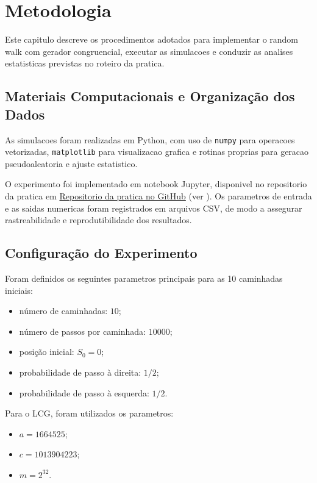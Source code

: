 \chapter{Metodologia}
\label{chap_metodologia}
Este capitulo descreve os procedimentos adotados para implementar o random walk com gerador congruencial, executar as simulacoes e conduzir as analises estatisticas previstas no roteiro da pratica.

\section{Materiais Computacionais e Organização dos Dados}

As simulacoes foram realizadas em Python, com uso de \texttt{numpy} para operacoes vetorizadas, \texttt{matplotlib} para visualizacao grafica e rotinas proprias para geracao pseudoaleatoria e ajuste estatistico.

O experimento foi implementado em notebook Jupyter, disponivel no repositorio da pratica em \href{https://github.com/LeonardoVieiraGuimaraes/DoutoradoCefet/tree/main/PrincipioModelagemMatematica/Trabalhos/PraticaGeradorRandonWalk}{Repositorio da pratica no GitHub} (ver \cite{github_random_walk}). Os parametros de entrada e as saidas numericas foram registrados em arquivos CSV, de modo a assegurar rastreabilidade e reprodutibilidade dos resultados.

\section{Configuração do Experimento}

Foram definidos os seguintes parametros principais para as 10 caminhadas iniciais:
\begin{itemize}
    \item número de caminhadas: $10$;
    \item número de passos por caminhada: $10000$;
    \item posição inicial: $S_0=0$;
    \item probabilidade de passo à direita: $1/2$;
    \item probabilidade de passo à esquerda: $1/2$.
\end{itemize}

Para o LCG, foram utilizados os parametros:
\begin{itemize}
    \item $a = 1664525$;
    \item $c = 1013904223$;
    \item $m = 2^{32}$.
\end{itemize}

